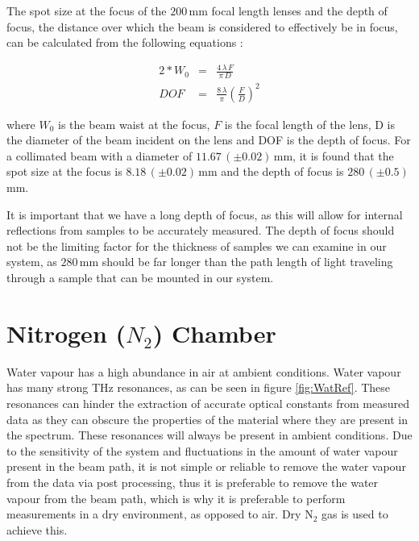 
The spot size at the focus of the $200\,$mm focal length lenses and the depth of focus, the distance over which the beam is considered to effectively be in focus, can be calculated from the following equations \cite{Newport-2019}:

\begin{eqnarray}
2*W_{0} &=& \frac{4\,\lambda\,F}{\pi\,D}\\
DOF &=& \frac{8\,\lambda}{\pi}\left(\frac{F}{D}\right)^{2}
\label{eq:DOF}
\end{eqnarray}

where $W_{0}$ is the beam waist at the focus, $F$ is the focal length of the lens, D is the diameter of the beam incident on the lens and DOF is the depth of focus. For a collimated beam with a diameter of $11.67\,(\pm 0.02)\,$mm, it is found that the spot size at the focus is $8.18\,(\pm 0.02)\,$mm and the depth of focus is $280\,(\pm 0.5)\,$mm.

It is important that we have a long depth of focus, as this will allow for internal reflections from samples to be accurately measured. The depth of focus should not be the limiting factor for the thickness of samples we can examine in our system, as $280\,$mm should be far longer than the path length of light traveling through a sample that can be mounted in our system.

\section{Nitrogen ($N_{2}$) Chamber}
\label{sec: Nitro}

Water vapour has a high abundance in air at ambient conditions. Water vapour has many strong THz resonances, as can be seen in figure \ref{fig:WatRef}. These resonances can hinder the extraction of accurate optical constants from measured data as they can obscure the properties of the material where they are present in the spectrum. These resonances will always be present in ambient conditions. Due to the sensitivity of the system and fluctuations in the amount of water vapour present in the beam path, it is not simple or reliable to remove the water vapour from the data via post processing, thus it is preferable to remove the water vapour from the beam path, which is why it is preferable to perform measurements in a dry environment, as opposed to air. Dry $\text{N}_{2}$ gas is used to achieve this.


